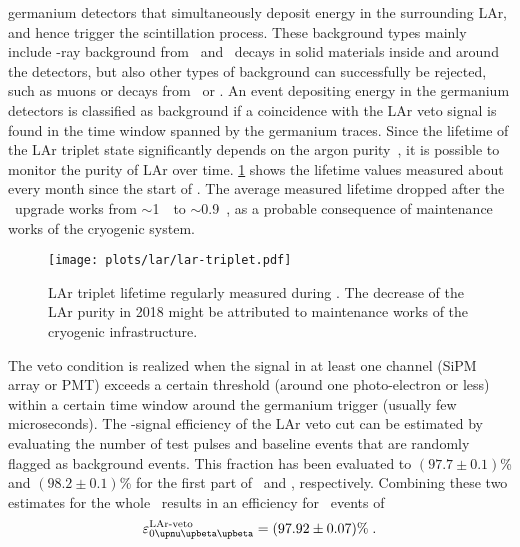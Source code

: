 germanium detectors that simultaneously deposit energy in the surrounding LAr, and hence
trigger the scintillation process. These background types mainly include \g-ray background
from \Ra\ and \Th\ decays in solid materials inside and around the detectors, but also
other types of background can successfully be rejected, such as muons or decays from \Arh\
or \kvz. An event depositing energy in the germanium detectors is classified as background
if a coincidence with the LAr veto signal is found in the time window spanned by the
germanium traces. Since the lifetime of the LAr triplet state significantly depends on the
argon purity~\cite{Amsler2007}, it is possible to monitor the purity of LAr over time.
\cref{fig:lar:triplet-lifetime} shows the lifetime values measured about every month since
the start of \phasetwo. The average measured lifetime dropped after the \phasetwop\
upgrade works from $\sim$1~\mus\ to $\sim$0.9~\mus, as a probable consequence of
maintenance works of the cryogenic system.
\begin{figure}
  \centering
  \texttt{[image: plots/lar/lar-triplet.pdf]}
  \caption{%
    LAr triplet lifetime regularly measured during \phasetwo. The decrease of the LAr
    purity in 2018 might be attributed to maintenance works of the cryogenic
    infrastructure.
  }\label{fig:lar:triplet-lifetime}
\end{figure}
The veto condition is realized when the signal in at least one channel (SiPM array or PMT)
exceeds a certain threshold (around one photo-electron or less) within a certain time
window around the germanium trigger (usually few microseconds). The \onbb-signal
efficiency of the LAr veto cut can be estimated by evaluating the number of test pulses
and baseline events that are randomly flagged as background events. This fraction has been
evaluated to $(97.7 \pm 0.1)$\% and $(98.2 \pm 0.1)$\% for the first part of \phasetwo\
and \phasetwop, respectively. Combining these two estimates for the whole \phasetwo\
results in an efficiency for \onbb\ events of
\[
  \epsilon_\onbbM^\text{LAr-veto} = (97.92 \pm 0.07)\% \;.
\]

